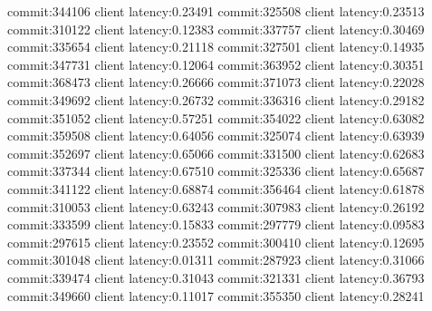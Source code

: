 commit:344106 client latency:0.23491
commit:325508 client latency:0.23513
commit:310122 client latency:0.12383
commit:337757 client latency:0.30469
commit:335654 client latency:0.21118
commit:327501 client latency:0.14935
commit:347731 client latency:0.12064
commit:363952 client latency:0.30351
commit:368473 client latency:0.26666
commit:371073 client latency:0.22028
commit:349692 client latency:0.26732
commit:336316 client latency:0.29182
commit:351052 client latency:0.57251
commit:354022 client latency:0.63082
commit:359508 client latency:0.64056
commit:325074 client latency:0.63939
commit:352697 client latency:0.65066
commit:331500 client latency:0.62683
commit:337344 client latency:0.67510
commit:325336 client latency:0.65687
commit:341122 client latency:0.68874
commit:356464 client latency:0.61878
commit:310053 client latency:0.63243
commit:307983 client latency:0.26192
commit:333599 client latency:0.15833
commit:297779 client latency:0.09583
commit:297615 client latency:0.23552
commit:300410 client latency:0.12695
commit:301048 client latency:0.01311
commit:287923 client latency:0.31066
commit:339474 client latency:0.31043
commit:321331 client latency:0.36793
commit:349660 client latency:0.11017
commit:355350 client latency:0.28241